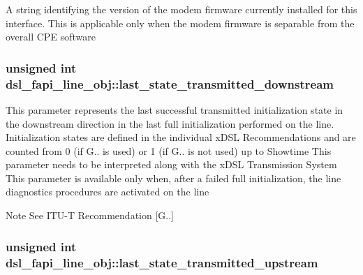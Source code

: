 A string identifying the version of the modem firmware currently installed for this interface. This is applicable only when the modem firmware is separable from the overall C\-P\-E software \hypertarget{structdsl__fapi__line__obj_a1b028b5780559bbff623c43f64c9221d}{
\subsubsection[{last\-\_\-state\-\_\-transmitted\-\_\-downstream}]{\setlength{\rightskip}{0pt plus 5cm}unsigned int dsl\-\_\-fapi\-\_\-line\-\_\-obj\-::last\-\_\-state\-\_\-transmitted\-\_\-downstream}}\label{structdsl__fapi__line__obj_a1b028b5780559bbff623c43f64c9221d}
This parameter represents the last successful transmitted initialization state in the downstream direction in the last full initialization performed on the line. Initialization states are defined in the individual x\-D\-S\-L Recommendations and are counted from 0 (if G.. is used) or 1 (if G.. is not used) up to Showtime This parameter needs to be interpreted along with the x\-D\-S\-L Transmission System This parameter is available only when, after a failed full initialization, the line diagnostics procedures are activated on the line \begin{DoxyNote}{Note}
See I\-T\-U-\/\-T Recommendation \mbox{[}G..\mbox{]} 
\end{DoxyNote}
\hypertarget{structdsl__fapi__line__obj_abb97dc2b4546129f3f3843fb29134e41}{
\subsubsection[{last\-\_\-state\-\_\-transmitted\-\_\-upstream}]{\setlength{\rightskip}{0pt plus 5cm}unsigned int dsl\-\_\-fapi\-\_\-line\-\_\-obj\-::last\-\_\-state\-\_\-transmitted\-\_\-upstream}}\label{structdsl__fapi__line__obj_abb97dc2b4546129f3f3843fb29134e41}
